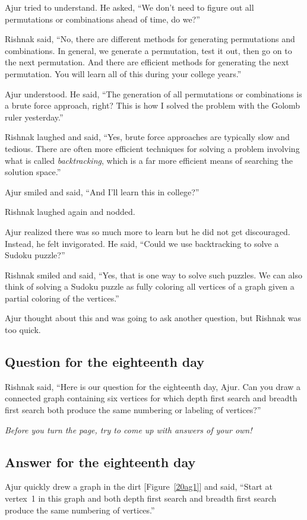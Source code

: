 Ajur tried to understand. He asked, ``We don't need to figure out all permutations or combinations ahead of time, do we?''

Rishnak said, ``No, there are different methods for generating permutations and combinations. In general, we generate a permutation, test it out, then go on to the next permutation. And there are efficient methods for generating the next permutation. You will learn all of this during your college years.''

Ajur understood. He said, ``The generation of all permutations or combinations is a brute force approach, right? This is how I solved the problem with the Golomb ruler yesterday.''

Rishnak laughed and said, ``Yes, brute force approaches are typically slow and tedious. There are often more efficient techniques for solving a problem involving what is called \textit{backtracking}, which is a far more efficient means of searching the solution space.''

Ajur smiled and said, ``And I'll learn this in college?''

Rishnak laughed again and nodded.

Ajur realized there was so much more to learn but he did not get discouraged. Instead, he felt invigorated. He said, ``Could we use backtracking to solve a Sudoku puzzle?''

Rishnak smiled and said, ``Yes, that is one way to solve such puzzles. We can also think of solving a Sudoku puzzle as fully coloring all vertices of a graph given a partial coloring of the vertices.''

Ajur thought about this and was going to ask another question, but Rishnak was too quick.

\subsection*{Question for the eighteenth day}
Rishnak said, ``Here is our question for the eighteenth day, Ajur.  Can you draw a connected graph containing six vertices for which depth first search and breadth first search both produce the same numbering or labeling of vertices?''

\textit{Before you turn the page, try to come up with answers of your own!}

\newpage
\subsection*{Answer for the eighteenth day}
Ajur quickly drew a graph in the dirt [Figure~\ref{20ag1}] and said, ``Start at vertex~1 in this graph and both depth first search and breadth first search produce the same numbering of vertices.''

